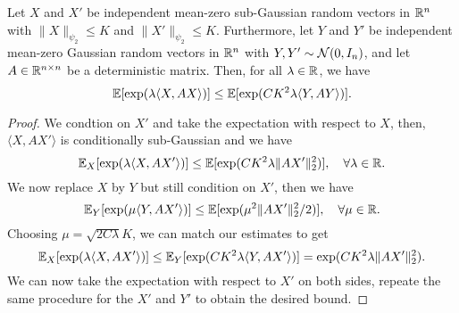 \begin{lemma}[Comparison]
	Let \(X\) and \(X'\) be independent mean-zero sub-Gaussian random vectors in \(\mathbb{R}^{n}\) with \(\|X\|_{\psi_{2}}\leq K\) and \(\|X'\|_{\psi_{2}}\leq K\). Furthermore, let \(Y\) and \(Y'\) be independent mean-zero Gaussian random vectors in \(\mathbb{R}^{n}\) with \(Y,Y'\sim\mathcal{N}(0, I_{n})\), and let \(A\in\mathbb{R}^{n\times n}\) be a deterministic matrix. Then, for all \(\lambda\in\mathbb{R}\), we have
	\begin{equation*}
		\mathbb{E}[\exp(\lambda\langle X, AX\rangle)]\leq\mathbb{E}[\exp(CK^{2}\lambda\langle Y, AY\rangle)].
	\end{equation*}
\end{lemma}

\begin{proof}
	We condtion on \(X'\) and take the expectation with respect to \(X\), then, \(\langle X, AX'\rangle\) is conditionally sub-Gaussian and we have
	\begin{equation*}
		\mathbb{E}_{X}[\exp(\lambda\langle X, AX'\rangle)]\leq\mathbb{E}[\exp(CK^{2}\lambda\|AX'\|_{2}^{2})],\quad\forall\lambda\in\mathbb{R}.
	\end{equation*}
	We now replace \(X\) by \(Y\) but still condition on \(X'\), then we have
	\begin{equation*}
		\mathbb{E}_{Y}[\exp(\mu\langle Y, AX'\rangle)]\leq\mathbb{E}[\exp(\mu^2\|AX'\|_{2}^{2}/2)],\quad\forall\mu\in\mathbb{R}.
	\end{equation*}
	Choosing \(\mu=\sqrt{2C\lambda}K\), we can match our estimates to get
	\begin{equation*}
		\mathbb{E}_{X}[\exp(\lambda\langle X, AX'\rangle)]\leq\mathbb{E}_{Y}[\exp(CK^{2}\lambda\langle Y, AX'\rangle)]=\exp(CK^{2}\lambda\|AX'\|_{2}^{2}).
	\end{equation*}
	We can now take the expectation with respect to \(X'\) on both sides, repeate the same procedure for the \(X'\) and \(Y'\) to obtain the desired bound.
\end{proof}

